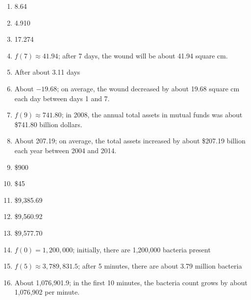 \documentclass{article}
\begin{document}
\begin{enumerate}
    \item 8.64
    \item 4.910
    \item 17.274
    
    \item $f(7) \approx 41.94$; after 7 days, the wound will be about 41.94 square cm.
    \item After about 3.11 days
    \item About $-19.68$; on average, the wound decreased by about 19.68 square cm each day between days 1 and 7.
    
    \item $f(9) \approx 741.80$; in 2008, the annual total assets in mutual funds was about \$741.80 billion dollars.
    \item About 207.19; on average, the total assets increased by about \$207.19 billion each year between 2004 and 2014.
    
    \item \$900
    \item \$45
    
    \item \$9,385.69
    \item \$9,560.92
    \item \$9,577.70
    
    \item $f(0) = 1,200,000$; initially, there are 1,200,000 bacteria present
    \item $f(5) \approx 3,789,831.5$; after 5 minutes, there are about 3.79 million bacteria
    \item About 1,076,901.9; in the first 10 minutes, the bacteria count grows by about 1,076,902 per minute.
\end{enumerate}
\end{document}
